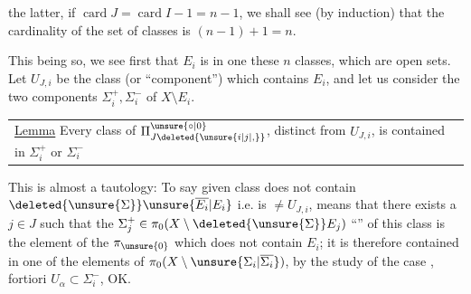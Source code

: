 the latter, if $\operatorname{card}J=\operatorname{card}I-1=n-1$, we shall see (by induction) that the cardinality of the set of classes is $(n-1)+1=n$.

This being so, we see first that $E_i$ is in one   these $n$ classes, which are open sets. Let $U_{J,i}$ be the class (or ``component'') which contains $E_i$, and let us consider the two components $\Sigma_i^+,\Sigma_i^-$ of $X\setminus E_i$.

\noindent\begin{tabular}{@{}|p{.91\linewidth}@{}}
\uline{Lemma} Every class of $\Pi_{J\deleted{\unsure{i|j|,}}}^{\unsure{\circ|0}}$, distinct from $U_{J,i}$, is contained in $\Sigma_i^+$ or $\Sigma_i^-$
\end{tabular}

This is almost a tautology: To say   given class  does not contain $\deleted{\unsure{\Sigma}}\unsure{\overline{E_i}|E_i}$ i.e. is $\ne U_{J,i}$, means that there exists a $j\in J$ such that the $\Sigma_j^+\in\pi_0(X\setminus \deleted{\unsure{\Sigma}}E_j)$  ``'' of this class  is the element of the $\pi_{\unsure{0}}$ which does not contain $E_i$; it is therefore contained in one of the elements  of $\pi_0(X\setminus\unsure{\Sigma_i|\overline{\Sigma_i}})$, by the study of the case  ,   fortiori $U_\alpha\subset\Sigma_i^-$, OK.
